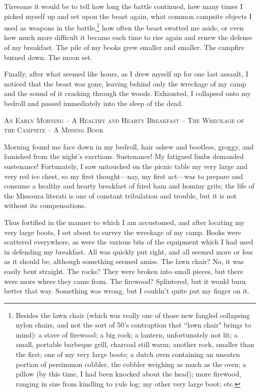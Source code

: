 \par
Tiresome it would be to tell how long the battle continued, how many times I picked myself up and set upon the beast again, what common campsite objects I used as weapons in the battle,\footnote{Besides the lawn chair (which was really one of those new fangled collapsing nylon chairs, and not the sort of 50's contraption that ``lawn chair" brings to mind): a stave of firewood; a big rock; a lantern, unfortunately not lit; a small, portable barbeque grill, charcoal still warm; another rock, smaller than the first; one of my very large boots; a dutch oven containing an uneaten portion of persimmon cobbler, the cobbler weighing as much as the oven; a pillow (by this time, I had been knocked about the head); more firewood, ranging in size from kindling to yule log; my other very large boot; etc.} how often the beast swatted me aside, or even how much more difficult it became each time to rise again and renew the defense of my breakfast.  The pile of my books grew smaller and smaller.  The campfire burned down.  The moon set.
\par
Finally, after what seemed like hours, as I drew myself up for one last assault, I noticed that the beast was gone, leaving behind only the wreckage of my camp and the sound of it crashing through the woods.  Exhausted, I collapsed onto my bedroll and passed immediately into the sleep of the dead.
\newpage
\par
\begin{center}
\textsc{An Early Morning – A Healthy and Hearty Breakfast – The Wreckage of the Campsite – A Missing Book}
\end{center}
\par
Morning found me face down in my bedroll, hair askew and bootless, groggy, and famished from the night's exertions.  Sustenance!  My fatigued limbs demanded sustenance!  Fortunately, I saw untouched on the picnic table my very large and very red ice chest, so my first thought—nay, my first act—was to prepare and consume a healthy and hearty breakfast of fried ham and hominy grits; the life of the Missoura literati is one of constant tribulation and trouble, but it is not without its compensations.
\par
Thus fortified in the manner to which I am accustomed, and after locating my very large boots, I set about to survey the wreckage of my camp.  Books were scattered everywhere, as were the various bits of the equipment which I had used in defending my breakfast.  All was quickly put right, and all seemed more or less as it should be, although something seemed amiss.  The lawn chair?  No, it was easily bent straight.  The rocks?  They were broken into small pieces, but there were more where they came from.  The firewood?  Splintered, but it would burn better that way.  Something was wrong, but I couldn't quite put my finger on it.
